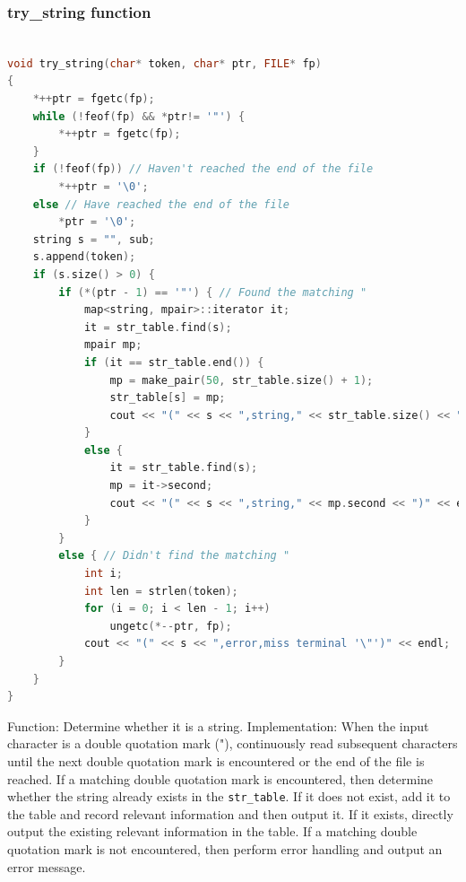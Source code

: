 \documentclass[a4paper,12pt]{article}
\begin{document}
\subsubsection{try\_string function}
\begin{lstlisting}[language=c++]

void try_string(char* token, char* ptr, FILE* fp)
{
    *++ptr = fgetc(fp);
    while (!feof(fp) && *ptr!= '"') {
        *++ptr = fgetc(fp);
    }
    if (!feof(fp)) // Haven't reached the end of the file
        *++ptr = '\0';
    else // Have reached the end of the file
        *ptr = '\0';
    string s = "", sub;
    s.append(token);
    if (s.size() > 0) {
        if (*(ptr - 1) == '"') { // Found the matching "
            map<string, mpair>::iterator it;
            it = str_table.find(s);
            mpair mp;
            if (it == str_table.end()) {
                mp = make_pair(50, str_table.size() + 1);
                str_table[s] = mp;
                cout << "(" << s << ",string," << str_table.size() << ")" << endl;
            }
            else {
                it = str_table.find(s);
                mp = it->second;
                cout << "(" << s << ",string," << mp.second << ")" << endl;
            }
        }
        else { // Didn't find the matching "
            int i;
            int len = strlen(token);
            for (i = 0; i < len - 1; i++)
                ungetc(*--ptr, fp);
            cout << "(" << s << ",error,miss terminal '\"')" << endl;
        }
    }
}
        \end{lstlisting}
        Function: Determine whether it is a string.
        Implementation: When the input character is a double quotation mark ("), continuously read subsequent characters until the next double quotation mark is encountered or the end of the file is reached. If a matching double quotation mark is encountered, then determine whether the string already exists in the \texttt{str\_table}. If it does not exist, add it to the table and record relevant information and then output it. If it exists, directly output the existing relevant information in the table. If a matching double quotation mark is not encountered, then perform error handling and output an error message.
        
\end{document}
